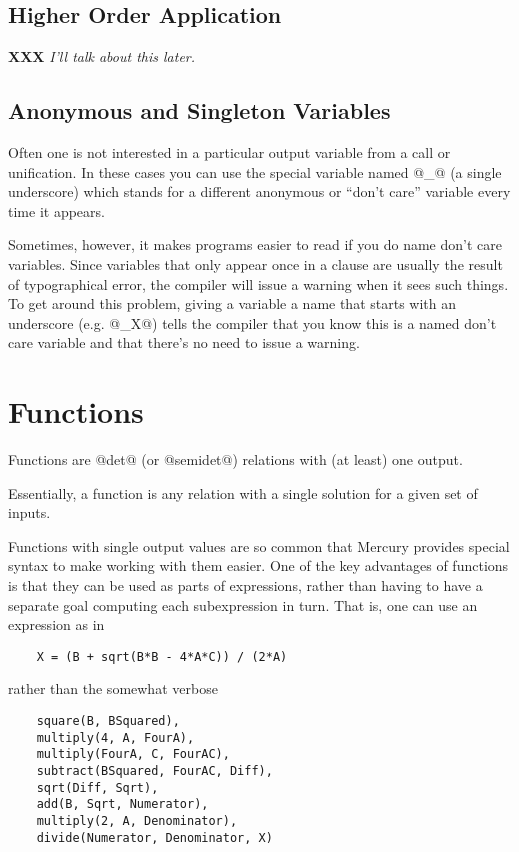 \documentclass[a4paper,11pt,notitlepage,onecolumn]{article}
\newcommand{\XXX}[1]%
{{\small\textbf{XXX} \emph{#1}}}
\begin{document}
\subsection{Higher Order Application}

\XXX{I'll talk about this later.}

\subsection{Anonymous and Singleton Variables}

Often one is not interested in a particular output variable
from a call or unification.  In these cases you can use the
special variable named @_@ (a single underscore) which stands
for a different anonymous or ``don't care'' variable every time
it appears.

Sometimes, however, it makes programs easier to read if you do
name don't care variables.  Since variables that only appear
once in a clause are usually the result of typographical
error, the compiler will issue a warning when it sees such
things.  To get around this problem, giving a variable a
name that starts with an underscore (e.g. @_X@) tells the compiler that
you know this is a named don't care variable and that there's
no need to issue a warning.



\section{Functions}

Functions are @det@ (or @semidet@) relations with (at least) one output.

Essentially, a function is any relation with a single solution for
a given set of inputs.

Functions with single output values are so common that Mercury provides
special syntax to make working with them easier.  One of the key
advantages of functions is that they can be used as parts of
expressions, rather than having to have a separate goal computing each
subexpression in turn.  That is, one can use an expression as in
\begin{verbatim}
    X = (B + sqrt(B*B - 4*A*C)) / (2*A)
\end{verbatim}
rather than the somewhat verbose
\begin{verbatim}
    square(B, BSquared),
    multiply(4, A, FourA),
    multiply(FourA, C, FourAC),
    subtract(BSquared, FourAC, Diff),
    sqrt(Diff, Sqrt),
    add(B, Sqrt, Numerator),
    multiply(2, A, Denominator),
    divide(Numerator, Denominator, X)
\end{verbatim}
\end{document}

